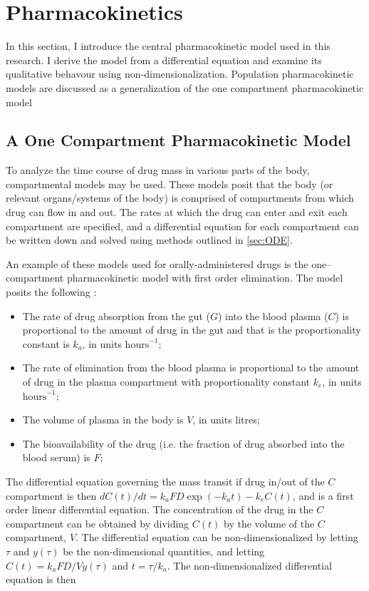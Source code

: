 \section{Pharmacokinetics} \label{PKPD}

In this section, I introduce the central pharmacokinetic model used in this research.  I derive the model from a differential equation and examine its qualitative behavour using non-dimensionalization.  Population pharmacokinetic models are discussed as a generalization of the one compartment pharmacokinetic model


\subsection{A One Compartment Pharmacokinetic Model} 

To analyze the time course of drug mass in various parts of the body, compartmental models may be used.  These models posit that the body (or relevant organs/systems of the body) is comprised of compartments from which drug can flow in and out. The rates at which the drug can enter and exit each compartment are specified, and a differential equation for each compartment can be written down and solved using methods outlined in \cref{sec:ODE}.

An example of these models used for orally-administered drugs is the one--compartment pharmacokinetic model with first order elimination.  The model posits the following \cite{wakefield1992bayesian}:  
%
\begin{itemize}
\item The rate of drug absorption from the gut ($ G  $) into the blood plasma ($ C $) is proportional to the amount of drug in the gut and that is the proportionality constant is $ k_a $, in units $ \text{hours}^{-1} $;

\item The rate of elimination from the blood plasma is proportional to the amount of drug in the plasma compartment with proportionality constant $ k_e $, in units $ \text{hours}^{-1} $;

\item The volume of plasma in the body is $ V $, in units litres;

\item The bioavailability of the drug (i.e. the fraction of drug absorbed into the blood serum) is $F$;
\end{itemize}

The differential equation governing the mass transit if drug in/out of the $C$ compartment is then $dC(t)/dt = k_aFD\exp(-k_a t) - k_eC(t)$, and is a first order linear differential equation.  The concentration of the drug in the $C$ compartment can be obtained by dividing $C(t)$ by the volume of the $C$ compartment, $V$.  The differential equation can be non-dimensionalized by letting $\tau$ and $y(\tau)$ be the non-dimensional quantities, and letting $C(t) = k_a FD/V y(\tau)$ and $t = \tau/k_a$.  The non-dimensionalized differential equation is then

